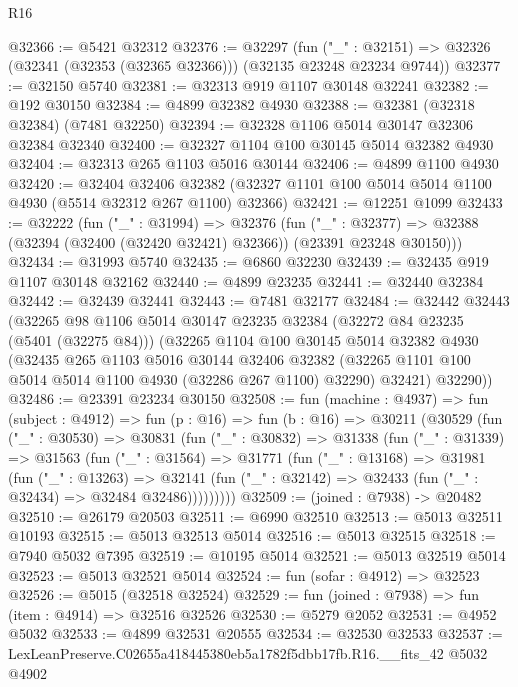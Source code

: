 \begin{lexlean}{R16}
\begin{coremodule}
@32366 := @5421 @32312
@32376 := @32297
    (fun ("_" : @32151) => @32326 (@32341 (@32353 (@32365 @32366))) (@32135 @23248 @23234 @9744))
@32377 := @32150 @5740
@32381 := @32313 @919 @1107 @30148 @32241
@32382 := @192 @30150
@32384 := @4899 @32382 @4930
@32388 := @32381 (@32318 @32384) (@7481 @32250)
@32394 := @32328 @1106 @5014 @30147 @32306 @32384 @32340
@32400 := @32327 @1104 @100 @30145 @5014 @32382 @4930
@32404 := @32313 @265 @1103 @5016 @30144
@32406 := @4899 @1100 @4930
@32420 := @32404
    @32406
    @32382
    (@32327 @1101 @100 @5014 @5014 @1100 @4930 (@5514 @32312 @267 @1100) @32366)
@32421 := @12251 @1099
@32433 := @32222
    (fun ("_" : @31994) =>
    @32376
      (fun ("_" : @32377) =>
      @32388 (@32394 (@32400 (@32420 @32421) @32366)) (@23391 @23248 @30150)))
@32434 := @31993 @5740
@32435 := @6860 @32230
@32439 := @32435 @919 @1107 @30148 @32162
@32440 := @4899 @23235
@32441 := @32440 @32384
@32442 := @32439 @32441
@32443 := @7481 @32177
@32484 := @32442
    @32443
    (@32265
      @98
      @1106
      @5014
      @30147
      @23235
      @32384
      (@32272 @84 @23235 (@5401 (@32275 @84)))
      (@32265
        @1104
        @100
        @30145
        @5014
        @32382
        @4930
        (@32435
          @265
          @1103
          @5016
          @30144
          @32406
          @32382
          (@32265 @1101 @100 @5014 @5014 @1100 @4930 (@32286 @267 @1100) @32290)
          @32421)
        @32290))
@32486 := @23391 @23234 @30150
@32508 := fun (machine : @4937) =>
  fun (subject : @4912) =>
  fun (p : @16) =>
  fun (b : @16) =>
  @30211
    (@30529
      (fun ("_" : @30530) =>
      @30831
        (fun ("_" : @30832) =>
        @31338
          (fun ("_" : @31339) =>
          @31563
            (fun ("_" : @31564) =>
            @31771
              (fun ("_" : @13168) =>
              @31981
                (fun ("_" : @13263) =>
                @32141 (fun ("_" : @32142) => @32433 (fun ("_" : @32434) => @32484 @32486)))))))))
@32509 := (joined : @7938) -> @20482
@32510 := @26179 @20503
@32511 := @6990 @32510
@32513 := @5013 @32511 @10193
@32515 := @5013 @32513 @5014
@32516 := @5013 @32515
@32518 := @7940 @5032 @7395
@32519 := @10195 @5014
@32521 := @5013 @32519 @5014
@32523 := @5013 @32521 @5014
@32524 := fun (sofar : @4912) => @32523
@32526 := @5015 (@32518 @32524)
@32529 := fun (joined : @7938) => fun (item : @4914) => @32516 @32526
@32530 := @5279 @2052
@32531 := @4952 @5032
@32533 := @4899 @32531 @20555
@32534 := @32530 @32533
@32537 := LexLeanPreserve.C02655a418445380eb5a1782f5dbb17fb.R16.__fits_42 @5032 @4902

\end{coremodule}
\end{lexlean}
